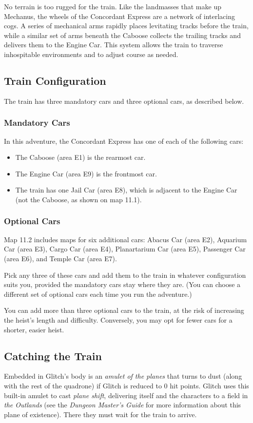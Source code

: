 \documentclass[10pt,a4paper,twoside,bg=print,twocolumn,openany,nodeprecatedcode]{dndbook}
\begin{document}
No terrain is too rugged for the train. Like the landmasses that make up Mechanus, the wheels of the Concordant Express are a network of interlacing cogs. A series of mechanical arms rapidly places levitating tracks before the train, while a similar set of arms beneath the Caboose collects the trailing tracks and delivers them to the Engine Car. This system allows the train to traverse inhospitable environments and to adjust course as needed.

\subsection{Train Configuration}
The train has three mandatory cars and three optional cars, as described below.

\subsubsection{Mandatory Cars}
In this adventure, the Concordant Express has one of each of the following cars:


\begin{itemize}
\item The Caboose (area E1) is the rearmost car.
\item The Engine Car (area E9) is the frontmost car.
\item The train has one Jail Car (area E8), which is adjacent to the Engine Car (not the Caboose, as shown on map 11.1).
\end{itemize}

\subsubsection{Optional Cars}
Map 11.2 includes maps for six additional cars: Abacus Car (area E2), Aquarium Car (area E3), Cargo Car (area E4), Planartarium Car (area E5), Passenger Car (area E6), and Temple Car (area E7).

Pick any three of these cars and add them to the train in whatever configuration suits you, provided the mandatory cars stay where they are. (You can choose a different set of optional cars each time you run the adventure.)

You can add more than three optional cars to the train, at the risk of increasing the heist's length and difficulty. Conversely, you may opt for fewer cars for a shorter, easier heist.

\subsection{Catching the Train}
Embedded in Glitch's body is an \textit{amulet of the planes} that turns to dust (along with the rest of the quadrone) if Glitch is reduced to 0 hit points. Glitch uses this built-in amulet to cast \textit{plane shift}, delivering itself and the characters to a field in \textit{the Outlands} (see the \textit{Dungeon Master's Guide} for more information about this plane of existence). There they must wait for the train to arrive.
\end{document}
